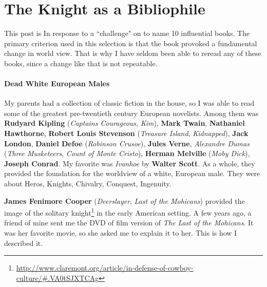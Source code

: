 \section{The Knight as a Bibliophile}

This post is In response to a ``challenge" on to name 10 influential books. The primary criterion used in this selection is that the book provoked a fundamental change in world view. That is why I have seldom been able to reread any of these books, since a change like that is not repeatable.

\paragraph{Dead White European Males}
My parents had a collection of classic fiction in the house, so I was able to read some of the greatest pre-twentieth century European novelists. Among them was \textbf{Rudyard Kipling} (\emph{Captains Courageous}, \emph{Kim}), \textbf{Mark Twain}, \textbf{Nathaniel Hawthorne}, \textbf{Robert Louis Stevenson} (\emph{Treasure Island}, \emph{Kidnapped}), \textbf{Jack London}, \textbf{Daniel Defoe} (\emph{Robinson Crusoe}), \textbf{Jules Verne}, \emph{Alexandre Dumas} (\emph{Three Musketeers}, \emph{Count of Monte Cristo}), \textbf{Herman Melville} (\emph{Moby Dick}), \textbf{Joseph Conrad}. My favorite was \emph{Ivanhoe} by \textbf{Walter Scott}. As a whole, they provided the foundation for the worldview of a white, European male. They were about Heros, Knights, Chivalry, Conquest, Ingenuity.

\textbf{James Fenimore Cooper} (\emph{Deerslayer}, \emph{Last of the Mohicans}) provided the image of the solitary knight\footnote{\url{http://www.claremont.org/article/in-defense-of-cowboy-culture/\#.VA0tSJXTCAg}} in the early American setting. A few years ago, a friend of mine sent me the DVD of film version of \emph{The Last of the Mohicans}. It was her favorite movie, so she asked me to explain it to her. This is how I described it.

